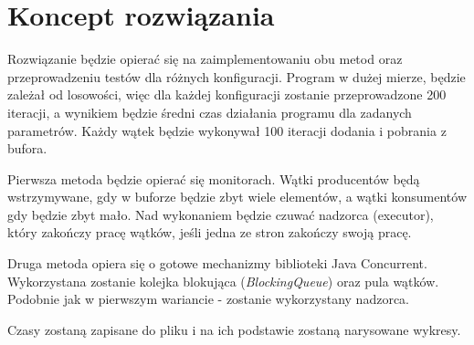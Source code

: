 \documentclass[12pt]{article}
\begin{document}
  
\section{Koncept rozwiązania}
Rozwiązanie będzie opierać się na zaimplementowaniu obu metod oraz przeprowadzeniu testów dla różnych konfiguracji. Program w dużej mierze, będzie zależał od losowości, więc dla każdej konfiguracji zostanie przeprowadzone 200 iteracji, a wynikiem będzie średni czas działania programu dla zadanych parametrów. Każdy wątek będzie wykonywał 100 iteracji dodania i pobrania z bufora.

Pierwsza metoda będzie opierać się monitorach. Wątki producentów będą wstrzymywane, gdy w buforze będzie zbyt wiele elementów, a wątki konsumentów gdy będzie zbyt mało. Nad wykonaniem będzie czuwać nadzorca (executor), który zakończy pracę wątków, jeśli jedna ze stron zakończy swoją pracę.

Druga metoda opiera się o gotowe mechanizmy biblioteki Java Concurrent. Wykorzystana zostanie kolejka blokująca (\emph{BlockingQueue}) oraz pula wątków. Podobnie jak w pierwszym wariancie - zostanie wykorzystany nadzorca.

Czasy zostaną zapisane do pliku i na ich podstawie zostaną narysowane wykresy. 

\newpage
\end{document}
